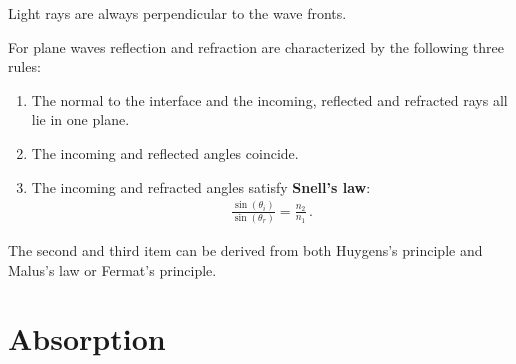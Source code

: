     \begin{theorem}
        Light rays are always perpendicular to the wave fronts.
    \end{theorem}

    \begin{property}
        For plane waves reflection and refraction are characterized by the following three rules:
        \begin{enumerate}
            \item The normal to the interface and the incoming, reflected and refracted rays all lie in one plane.
            \item The incoming and reflected angles coincide.
            \item The incoming and refracted angles satisfy \textbf{Snell's law}:
            \begin{gather}
                \frac{\sin(\theta_i)}{\sin(\theta_r)}=\frac{n_2}{n_1}\,.
            \end{gather}
        \end{enumerate}
        The second and third item can be derived from both Huygens's principle and Malus's law or Fermat's principle.
    \end{property}

\section{Absorption}

